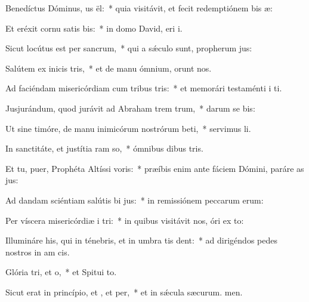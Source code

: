 \item Benedíctus Dóminus, us ël:~* quia visitávit, et fecit redemptiónem bis æ:
\item Et eréxit cornu satis bis:~* in domo David, eri i.
\item Sicut locútus est per  sancrum,~* qui a sǽculo sunt, propherum jus:
\item Salútem ex inicis tris,~* et de manu ómnium,  orunt nos.
\item Ad faciéndam misericórdiam cum tribus tris:~* et memorári testaménti i ti.
\item Jusjurándum, quod jurávit ad Abraham trem trum,~* darum se bis:
\item Ut sine timóre, de manu inimicórum nostrórum beti,~* servimus li.
\item In sanctitáte, et justítia ram so,~* ómnibus dibus tris.
\item Et tu, puer, Prophéta Altíssi voris:~* præíbis enim ante fáciem Dómini, paráre as jus:
\item Ad dandam sciéntiam salútis bi jus:~* in remissiónem peccarum erum:
\item Per víscera misericórdiæ i tri:~* in quibus visitávit nos, óri ex to:
\item Illumináre his, qui in ténebris, et in umbra tis dent:~* ad dirigéndos pedes nostros in am cis.
\item Glória tri, et o,~* et Spitui to.
\item Sicut erat in princípio, et , et per,~* et in sǽcula sæcurum. men.
